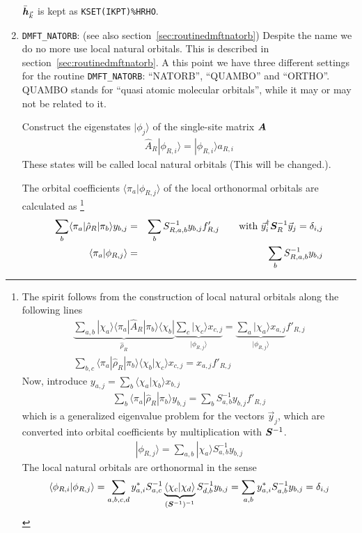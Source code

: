 \documentclass[11pt,a4paper]{report}
\begin{document}
\begin{enumerate}
$\bar{\bm{h}}_{\vec{k}}$ is kept as \verb|KSET(IKPT)%HRHO|.
%
\item \verb|DMFT_NATORB|: (see also
  section~\ref{sec:routinedmftnatorb}) Despite the name we do no more
  use local natural orbitals. This is described in
  section~\ref{sec:routinedmftnatorb}. A this point we have three
  different settings for the routine \verb|DMFT_NATORB|: ``NATORB'',
  ``QUAMBO'' and ``ORTHO''. QUAMBO stands for ``quasi atomic molecular
  orbitals''\cite{qian08_prb78_245112}, while it may or may not be
  related to it.

  Construct the eigenstates $|\phi_j\rangle$ of the single-site
   matrix $\bm{A}$
\begin{eqnarray}
\hat{A}_R|\phi_{R,i}\rangle=|\phi_{R,i}\rangle a_{R,i}
\end{eqnarray}
These states will be called local natural orbitals (This will be
changed.).

The orbital coefficients $\langle\pi_a|\phi_{R,j}\rangle$ of the local
orthonormal orbitals are calculated as
\footnote{The spirit follows from the construction of local natural
  orbitals along the following lines
\begin{eqnarray}
\underbrace{\sum_{a,b}|\chi_a\rangle\langle\pi_a|\hat{A}_R|\pi_b\rangle
\langle\chi_b|}_{\hat{\rho}_R}
\underbrace{\sum_c|\chi_c\rangle x_{c,j}}_{|\phi_{R,j}\rangle}
=\underbrace{\sum_a|\chi_a\rangle x_{a,j}}_{|\phi_{R,j}\rangle} f'_{R,j}
\nonumber\\
\sum_{b,c}\langle\pi_a|\hat{\rho}_R|\pi_b\rangle
\langle\chi_b|\chi_c\rangle x_{c,j}
=x_{a,j}f'_{R,j}
\end{eqnarray}
Now, introduce $y_{a,j}=\sum_b\langle\chi_a|\chi_b\rangle x_{b,j}$
\begin{eqnarray}
\sum_{b}\langle\pi_a|\hat{\rho}_R|\pi_b\rangle y_{b,j}
=\sum_b S^{-1}_{a,b}y_{b,j}f'_{R,j}
\end{eqnarray}
which is a generalized eigenvalue problem for the vectors $\vec{y}_j$,
which are converted into orbital coefficients by multiplication with
$\bm{S}^{-1}$.
\begin{eqnarray}
|\phi_{R,j}\rangle=\sum_{a,b}|\chi_a\rangle S^{-1}_{a,b} y_{b,j}
\end{eqnarray}
The local natural orbitals are orthonormal in the sense
\begin{eqnarray}
\langle\phi_{R,i}|\phi_{R,j}\rangle
=\sum_{a,b,c,d}
y^*_{a,i}S^{-1}_{a,c}
\underbrace{\langle\chi_c|\chi_d\rangle}_{(\bm{S}^{-1})^{-1}}
 S^{-1}_{d,b} y_{b,j}
=\sum_{a,b}y^*_{a,i}S^{-1}_{a,b}y_{b,j}=\delta_{i,j}
\end{eqnarray}
}
\begin{eqnarray}
\sum_{b}\langle\pi_a|\hat{\rho}_R|\pi_b\rangle y_{b,j}
&=&\sum_b S^{-1}_{R,a,b}y_{b,j}f'_{R,j}
\qquad\text{with $\vec{y}^\dagger_i \bm{S}^{-1}_R\vec{y}_{j}=\delta_{i,j}$}
\\
\langle\pi_a|\phi_{R,j}\rangle&=&\sum_{b} S^{-1}_{R,a,b} y_{b,j}
\end{eqnarray}


\end{enumerate}
\end{document}
